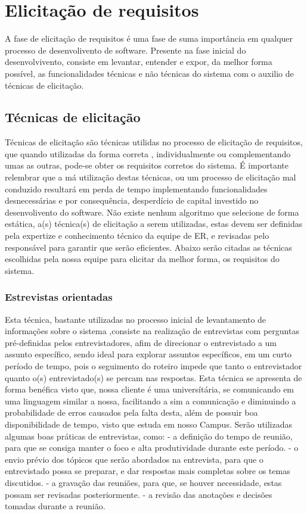 \chapter{Elicitação de requisitos}

A fase de elicitação de requisitos é uma fase de suma importância em qualquer processo de  desenvolivento de software. 
Presente na fase inicial do desenvolvivento, consiste em levantar, entender e expor, da melhor forma possível, as funcionalidades técnicas e não técnicas do sistema
com o auxilio de técnicas de elicitação.

  \section{Técnicas de elicitação}
 
 Técnicas de elicitação são técnicas utilidas no processo de elicitação de requisitos, que quando utilizadas da forma correta
  , individualmente ou complementando umas as outras, pode-se obter os requisitos corretos do sistema.
  É importante relembrar que a má utilização destas técnicas, ou um processo de elicitação 
  mal conduzido resultará em perda de tempo implementando funcionalidades desnecessárias e por 
  consequência, desperdício de capital investido no desenvolivento do software.
  Não existe nenhum algoritmo que selecione de forma estática, a(s) técnica(s) de elicitação a serem utilizadas, 
  estas devem ser definidas pela expertize e conhecimento técnico da equipe de ER, e revisadas pelo responsável para garantir
  que serão eficientes.
  Abaixo serão citadas as técnicas escolhidas pela nossa equipe para elicitar da melhor forma, os requisitos do sistema.
  
  \subsection{Estrevistas orientadas}
  
  Esta técnica, bastante utilizadas no processo inicial de levantamento de informações sobre o sistema
  ,consiste na realização de entrevistas com perguntas pré-definidas pelos entrevistadores, afim de direcionar o 
  entrevistado a um assunto específico, sendo ideal para explorar assuntos específicos, em um curto período de tempo,
  pois o seguimento do roteiro impede que tanto o entrevistador quanto o(s) entrevistado(s) se percam nas respostas. Esta 
  técnica se apresenta de forma benéfica visto que, nossa cliente é uma universítária, se comunicando em uma linguagem 
  similar a nossa, facilitando a sim a comunicação e diminuindo a probabilidade de erros causados pela falta desta, além de
  possuir boa disponibilidade de tempo, visto que estuda em nosso Campus.
  Serão utilizadas algumas boas práticas de entrevistas, como: 
  - a definição do tempo de reunião, para que se consiga manter o foco
  e alta produtividade durante este período.
  - o envio prévio dos tópicos que serão abordados na entrevista, para que o entrevistado possa se preparar, e dar respostas mais
  completas sobre os temas discutidos.
  - a gravação das reuniões, para que, se houver necessidade, estas possam ser revisadas posteriormente.
  - a revisão das anotações e decisões tomadas durante a reunião.
  
